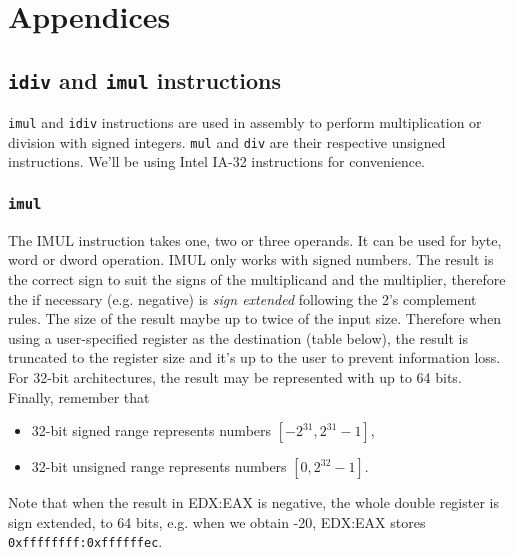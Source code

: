 \documentclass[a4paper]{article}
\begin{document}
\newpage
\appendix

\section{Appendices}

\newpage
\subsection{\texttt{idiv} and \texttt{imul} instructions}
\label{app:idiv_imul}
\texttt{imul} and \texttt{idiv} instructions are used in assembly to perform multiplication or division with signed integers. \texttt{mul} and \texttt{div} are their respective unsigned instructions. We'll be using Intel IA-32 instructions for convenience. 


\subsubsection{\texttt{imul}}
 

The IMUL instruction takes one, two or three operands. It can be used for byte, word or dword operation. IMUL only works with signed numbers. The result is the correct sign to suit the signs of the multiplicand and the multiplier, therefore the if necessary (e.g. negative) is \textit{sign extended} following the 2's complement rules. The size of the result maybe up to twice of the input size. Therefore when using a user-specified register as the destination (table below), the result is truncated to the register size and it's up to the user to prevent information loss. For 32-bit architectures, the result may be represented with up to 64 bits. Finally, remember that 
\begin{itemize}
    \item 32-bit signed range represents numbers $[-2^{31},2^{31}-1]$,
    \item 32-bit unsigned range represents numbers $[0, 2^{32}-1]$.
\end{itemize}




Note that when the result in EDX:EAX is negative, the whole double register is sign extended, to 64 bits, e.g. when we obtain -20, EDX:EAX stores \texttt{0xffffffff:0xffffffec}.
\end{document}
